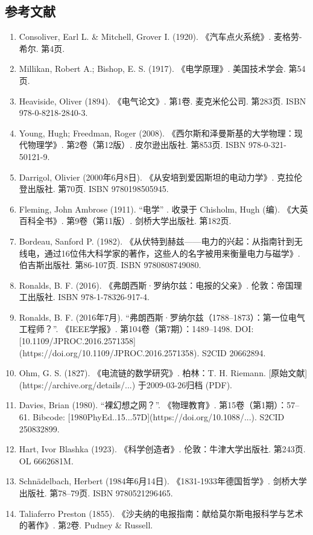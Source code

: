 \subsection{参考文献}  
\begin{enumerate}
\item Consoliver, Earl L. & Mitchell, Grover I. (1920). 《汽车点火系统》. 麦格劳-希尔. 第4页.  
\item Millikan, Robert A.; Bishop, E. S. (1917). 《电学原理》. 美国技术学会. 第54页.  
\item Heaviside, Oliver (1894). 《电气论文》. 第1卷. 麦克米伦公司. 第283页. ISBN 978-0-8218-2840-3.  
\item Young, Hugh; Freedman, Roger (2008). 《西尔斯和泽曼斯基的大学物理：现代物理学》. 第2卷（第12版）. 皮尔逊出版社. 第853页. ISBN 978-0-321-50121-9.  
\item Darrigol, Olivier (2000年6月8日). 《从安培到爱因斯坦的电动力学》. 克拉伦登出版社. 第70页. ISBN 9780198505945.  
\item Fleming, John Ambrose (1911). “电学” . 收录于 Chisholm, Hugh (编). 《大英百科全书》. 第9卷（第11版）. 剑桥大学出版社. 第182页.  
\item Bordeau, Sanford P. (1982). 《从伏特到赫兹——电力的兴起：从指南针到无线电，通过16位伟大科学家的著作，这些人的名字被用来衡量电力与磁学》. 伯吉斯出版社. 第86-107页. ISBN 9780808749080.  
\item Ronalds, B. F. (2016). 《弗朗西斯·罗纳尔兹：电报的父亲》. 伦敦：帝国理工出版社. ISBN 978-1-78326-917-4.
\item Ronalds, B. F. (2016年7月). “弗朗西斯·罗纳尔兹（1788–1873）：第一位电气工程师？”. 《IEEE学报》. 第104卷（第7期）：1489–1498. DOI: [10.1109/JPROC.2016.2571358](https://doi.org/10.1109/JPROC.2016.2571358). S2CID 20662894.
\item Ohm, G. S. (1827). 《电流链的数学研究》. 柏林：T. H. Riemann. [原始文献](https://archive.org/details/...) 于2009-03-26归档 (PDF).
\item Davies, Brian (1980). “裸幻想之网？”. 《物理教育》. 第15卷（第1期）：57–61. Bibcode: [1980PhyEd..15...57D](https://doi.org/10.1088/...). S2CID 250832899.
\item Hart, Ivor Blashka (1923). 《科学创造者》. 伦敦：牛津大学出版社. 第243页. OL 6662681M.
\item Schnädelbach, Herbert (1984年6月14日). 《1831-1933年德国哲学》. 剑桥大学出版社. 第78–79页. ISBN 9780521296465.
\item Taliaferro Preston (1855). 《沙夫纳的电报指南：献给莫尔斯电报科学与艺术的著作》. 第2卷. Pudney & Russell.

\end{enumerate}

